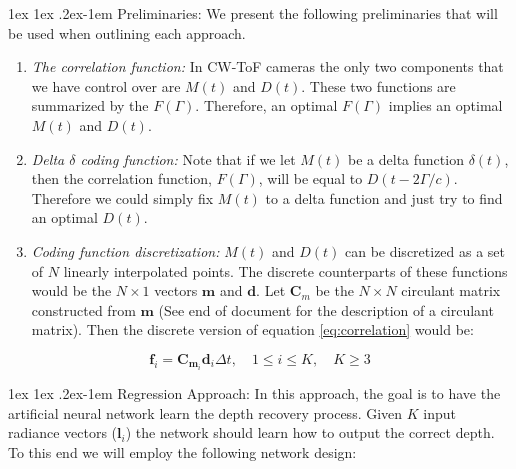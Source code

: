 \documentclass[11pt]{article}
\makeatletter
\def \m {\mathbf{m}}
\def \d {\mathbf{d}}
\def \f {\mathbf{f}}
\def \l {\mathbf{l}}
\renewcommand{\paragraph}{%
  \@startsection{paragraph}{4}%
  {\z@}{1ex \@plus 1ex \@minus .2ex}{-1em}%
  {\normalfont\normalsize\bfseries}%
}
\makeatother
\begin{document}
\paragraph{Preliminaries: }We present the following preliminaries that will be used when outlining each approach.
\begin{enumerate}
	\item{\textit{The correlation function:}} In CW-ToF cameras the only two components that we have control over are $M(t)$ and $D(t)$. These two functions are summarized by the $F(\Gamma)$. Therefore, an optimal $F(\Gamma)$ implies an optimal $M(t)$ and $D(t)$.
	\item{\textit{Delta $\delta$ coding function:} } Note that if we let $M(t)$ be a delta function $\delta(t)$, then the correlation function, $F(\Gamma)$, will be equal to $D(t - 2\Gamma/c)$. Therefore we could simply fix $M(t)$ to a delta function and just try to find an optimal $D(t)$.
	\item{\textit{Coding function discretization:}} $M(t)$ and $D(t)$ can be discretized as a set of $N$ linearly interpolated points. The discrete counterparts of these functions would be the $N \times 1$ vectors $\m$ and $\d$. Let $\mathbf{C}_m$ be the $N \times N$ circulant matrix constructed from $\m$ (See end of document for the description of a circulant matrix). Then the discrete version of equation \ref{eq:correlation} would be:
\end{enumerate}

\begin{equation} \label{eq:discreteCorrelation}
    \f_{i} = \mathbf{C}_{\m_i}\d_{i} \Delta t, \quad 1 \leq i \leq K, \quad K \geq 3
\end{equation}

\paragraph{Regression Approach:} In this approach, the goal is to have the artificial neural network learn the depth recovery process. Given $K$ input radiance vectors ($\l_i$) the network should learn how to output the correct depth. To this end we will employ the following network design:
\end{document}
